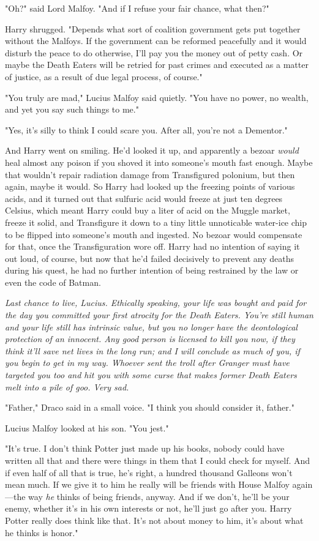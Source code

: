 "Oh?" said Lord Malfoy. "And if I refuse your fair chance, what then?"

Harry shrugged. "Depends what sort of coalition government gets put together
without the Malfoys. If the government can be reformed peacefully and it would
disturb the peace to do otherwise, I'll pay you the money out of petty cash. Or
maybe the Death Eaters will be retried for past crimes and executed as a matter
of justice, as a result of due legal process, of course."

"You truly are mad," Lucius Malfoy said quietly. "You have no power, no wealth,
and yet you say such things to me."

"Yes, it's silly to think I could scare you. After all, you're not a Dementor."

And Harry went on smiling. He'd looked it up, and apparently a bezoar
\emph{would} heal almost any poison if you shoved it into someone's mouth fast
enough. Maybe that wouldn't repair radiation damage from Transfigured polonium,
but then again, maybe it would. So Harry had looked up the freezing points of
various acids, and it turned out that sulfuric acid would freeze at just ten
degrees Celsius, which meant Harry could buy a liter of acid on the Muggle
market, freeze it solid, and Transfigure it down to a tiny little unnoticable
water-ice chip to be flipped into someone's mouth and ingested. No bezoar would
compensate for that, once the Transfiguration wore off. Harry had no intention
of saying it out loud, of course, but now that he'd failed decisively to
prevent any deaths during his quest, he had no further intention of being
restrained by the law or even the code of Batman.

\emph{Last chance to live, Lucius. Ethically speaking, your life was bought and
paid for the day you committed your first atrocity for the Death Eaters. You're
still human and your life still has intrinsic value, but you no longer have the
deontological protection of an innocent. Any good person is licensed to kill
you now, if they think it'll save net lives in the long run; and I will
conclude as much of you, if you begin to get in my way. Whoever sent the troll
after Granger must have targeted you too and hit you with some curse that makes
former Death Eaters melt into a pile of goo. Very sad.}

"Father," Draco said in a small voice. "I think you should consider it, father."

Lucius Malfoy looked at his son. "You jest."

"It's true. I don't think Potter just made up his books, nobody could have
written all that and there were things in them that I could check for myself.
And if even half of all that is true, he's right, a hundred thousand Galleons
won't mean much. If we give it to him he really will be friends with House
Malfoy again---the way \emph{he} thinks of being friends, anyway. And if we
don't, he'll be your enemy, whether it's in his own interests or not, he'll
just go after you. Harry Potter really does think like that. It's not about
money to him, it's about what he thinks is honor."

